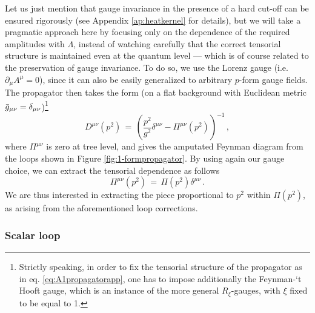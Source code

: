 Let us just mention that gauge invariance in the presence of a hard cut-off can be ensured rigorously (see Appendix \ref{ap:heatkernel} for details), but we will take a pragmatic approach here by focusing only on the dependence of the required amplitudes with $\Lambda$, instead of watching carefully that the correct tensorial structure is maintained even at the quantum level --- which is of course related to the preservation of gauge invariance. To do so, we use the Lorenz gauge (i.e. $\partial_\mu A^\mu=0$), since it can also be easily generalized to arbitrary $p$-form gauge fields. The propagator then takes the form (on a flat background with Euclidean metric $\Bar{g}_{\mu \nu}= \delta_{\mu \nu}$)\footnote{\label{fn:FeynmantHooftgauge}Strictly speaking, in order to fix the tensorial structure of the propagator as in eq. \eqref{eq:A1propagatorapp}, one has to impose additionally the Feynman-`t Hooft gauge, which is an instance of the more general $R_{\xi}$-gauges, with $\xi$ fixed to be equal to 1.} 
%
\begin{equation}
\label{eq:A1propagatorapp}
			D^{\mu \nu} (p^2) \, = \, \left( \dfrac{p^2}{g^2} \delta ^{\mu \nu} - \Pi^{\mu \nu}(p^2) \right)^{-1}\, ,
\end{equation}
%
where $\Pi^{\mu \nu}$ is zero at tree level, and gives the amputated Feynman diagram from the loops shown in Figure \ref{fig:1-formpropagator}. By using again our gauge choice, we can extract the tensorial dependence as follows 
%
\begin{equation}
			\label{eq:A1loopamplitudeapp}
			\Pi^{\mu \nu} (p^2) \, = \, \Pi(p^2) \delta ^{\mu \nu} \, .
\end{equation}
%
We are thus interested in extracting the piece proportional to $p^2$ within $\Pi(p^2)$, as arising from the aforementioned loop corrections.
		
\subsubsection*{Scalar loop}
		
